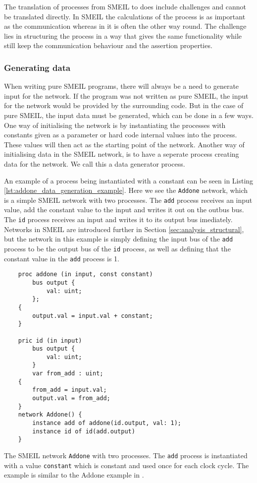 The translation of processes from SMEIL to \cspm does include challenges and cannot be translated directly. In SMEIL the calculations of the process is as important as the communication whereas in \cspm it is often the other way round. The challenge lies in structuring the \cspm process in a way that gives the same functionality while still keep the \cspm communication behaviour and the assertion properties.

\subsubsection{Generating data}
When writing pure SMEIL programs, there will always be a need to generate input for the network. If the program was not written as pure SMEIL, the input for the network would be provided by the surrounding code. But in the case of pure SMEIL, the input data must be generated, which can be done in a few ways.
One way of initialising the network is by instantiating the processes with constants given as a parameter or hard code internal values into the process. These values will then act as the starting point of the network. Another way of initialising data in the SMEIL network, is to have a seperate process creating data for the network. We call this a data generator process.

An example of a process being instantiated with a constant can be seen in Listing \ref{lst:addone_data_generation_example}. Here we see the \texttt{Addone} network, which is a simple SMEIL network with two processes. The \texttt{add} process receives an input value, add the constant value to the input and writes it out on the outbus bus. The \texttt{id} process receives an input and writes it to its output bus imediately. Networks in SMEIL are introduced further in Section \ref{sec:analysis_structural}, but the network in this example is simply defining the input bus of the \texttt{add} process to be the output bus of the \texttt{id} process, as well as defining that the constant value in the \texttt{add} process is 1.

\begin{listing}
    \begin{verbatim}
    proc addone (in input, const constant)
        bus output {
            val: uint;
        };
    {
        output.val = input.val + constant;
    }

    pric id (in input)
        bus output {
            val: uint;
        }
        var from_add : uint;
    {
        from_add = input.val;
        output.val = from_add;
    }
    network Addone() {
        instance add of addone(id.output, val: 1);
        instance id of id(add.output)
    }
    \end{verbatim}
    \caption{The SMEIL network \texttt{Addone} with two processes. The \texttt{add} process is instantiated with a value \texttt{constant} which is constant and used once for each clock cycle. The example is similar to the Addone example in \cite{smeil}.}
    \label{lst:addone_data_generation_example}
\end{listing}



